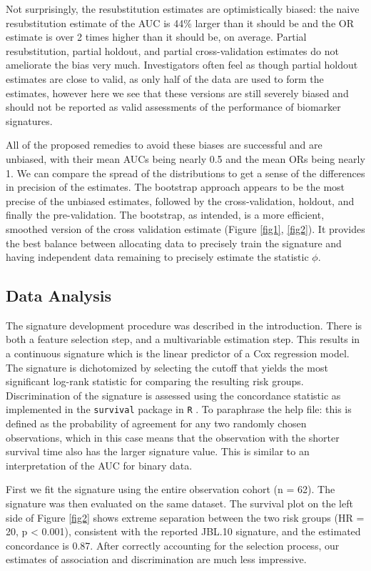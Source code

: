 \documentclass[12pt,]{article}
\begin{document}
Not surprisingly, the resubstitution estimates are optimistically
biased: the naive resubstitution estimate of the AUC is 44\% larger than
it should be and the OR estimate is over 2 times higher than it should
be, on average. Partial resubstitution, partial holdout, and partial
cross-validation estimates do not ameliorate the bias very much.
Investigators often feel as though partial holdout estimates are close
to valid, as only half of the data are used to form the estimates,
however here we see that these versions are still severely biased and
should not be reported as valid assessments of the performance of
biomarker signatures.

All of the proposed remedies to avoid these biases are successful and
are unbiased, with their mean AUCs being nearly 0.5 and the mean ORs
being nearly 1. We can compare the spread of the distributions to get a
sense of the differences in precision of the estimates. The bootstrap
approach appears to be the most precise of the unbiased estimates,
followed by the cross-validation, holdout, and finally the
pre-validation. The bootstrap, as intended, is a more efficient,
smoothed version of the cross validation estimate (Figure \ref{fig1},
\ref{fig2}). It provides the best balance between allocating data to
precisely train the signature and having independent data remaining to
precisely estimate the statistic \(\phi\).

\subsection{Data Analysis}\label{data-analysis}

The signature development procedure was described in the introduction.
There is both a feature selection step, and a multivariable estimation
step. This results in a continuous signature which is the linear
predictor of a Cox regression model. The signature is dichotomized by
selecting the cutoff that yields the most significant log-rank statistic
for comparing the resulting risk groups. Discrimination of the signature
is assessed using the concordance statistic as implemented in the
\texttt{survival} package in \texttt{R} \citep{survival}. To paraphrase
the help file: this is defined as the probability of agreement for any
two randomly chosen observations, which in this case means that the
observation with the shorter survival time also has the larger signature
value. This is similar to an interpretation of the AUC for binary data.

First we fit the signature using the entire observation cohort (n = 62).
The signature was then evaluated on the same dataset. The survival plot
on the left side of Figure \ref{fig2} shows extreme separation between
the two risk groups (HR = 20, p \textless{} 0.001), consistent with the
reported JBL.10 signature, and the estimated concordance is 0.87. After
correctly accounting for the selection process, our estimates of
association and discrimination are much less impressive.
\end{document}
